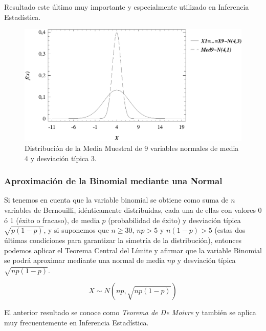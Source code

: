 \documentclass[a4paper]{article}
\begin{document}
Resultado este último muy importante y especialmente utilizado en
Inferencia Estadística.

\begin{figure}[h!]
\begin{center}
\includegraphics[scale=0.7]{grafica2.eps}
\caption{Distribución de la Media Muestral de 9 variables normales
de media 4 y desviación típica 3.}
\end{center}
\end{figure}


\subsubsection*{Aproximación de la Binomial mediante una Normal}

Si tenemos en cuenta que la variable binomial se obtiene como suma
de $n$ variables de Bernouilli, idénticamente distribuidas, cada
una de ellas con valores 0 ó 1 (éxito o fracaso), de media $p$
(probabilidad de éxito) y desviación típica $\sqrt{p(1-p)}$, y si
suponemos que $n\geq 30$, $np>5$ y $n(1-p)>5$ (estas dos últimas
condiciones para garantizar la simetría de la distribución),
entonces podemos aplicar el Teorema Central del Límite y afirmar
que la variable Binomial se podrá aproximar mediante una normal de
media $np$ y desviación típica $\sqrt{np(1-p)}$.

\[
X\sim N\left( {np,\sqrt {np\left( {1 - p} \right)} } \right)
\]

El anterior resultado se conoce como \emph{Teorema de De Moivre} y
también se aplica muy frecuentemente en Inferencia Estadística.
\end{document}
